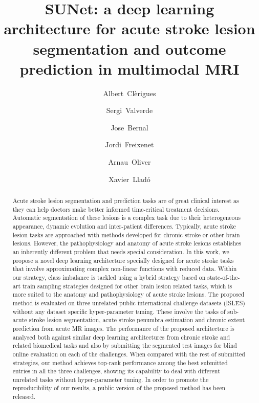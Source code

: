 \documentclass[letterpaper,final,authoryear,3p,times,twocolumn]{elsarticle}
\begin{document}
	
\begin{frontmatter}
	
	\title{SUNet: a deep learning architecture for acute stroke lesion segmentation and outcome prediction in multimodal MRI}
	
	\author{Albert~Cl\`erigues }
	\author{Sergi~Valverde \corref{}}
	\author{Jose~Bernal \corref{}}
	\author{Jordi~Freixenet \corref{}}
	\author{Arnau~Oliver \corref{}}
	\author{Xavier~Llad\'o \corref{}}
	
	\address{Institute of Computer Vision and Robotics, University of Girona, Spain}
	
	
	\begin{abstract}
		Acute stroke lesion segmentation and prediction tasks are of great clinical interest as they can help doctors make better informed time-critical treatment decisions. Automatic segmentation of these lesions is a complex task due to their heterogeneous appearance, dynamic evolution and inter-patient differences. Typically, acute stroke lesion tasks are approached with methods developed for chronic stroke or other brain lesions. However, the pathophysiology and anatomy of acute stroke lesions establishes an inherently different problem that needs special consideration. In this work, we propose a novel deep learning architecture specially designed for acute stroke tasks that involve approximating complex non-linear functions with reduced data. Within our strategy, class imbalance is tackled using a hybrid strategy based on state-of-the-art train sampling strategies designed for other brain lesion related tasks, which is more suited to the anatomy and pathophysiology of acute stroke lesions. The proposed method is evaluated on three unrelated public international challenge datasets (ISLES) without any dataset specific hyper-parameter tuning. These involve the tasks of sub-acute stroke lesion segmentation, acute stroke penumbra estimation and chronic extent prediction from acute MR images. The performance of the proposed architecture is analysed both against similar deep learning architectures from chronic stroke and related biomedical tasks and also by submitting the segmented test images for blind online evaluation on each of the challenges. When compared with the rest of submitted strategies, our method achieves top-rank performance among the best submitted entries in all the three challenges, showing its capability to deal with different unrelated tasks without hyper-parameter tuning. In order to promote the reproducibility of our results, a public version of the proposed method has been released.
	\end{abstract}
	

\end{frontmatter}
\end{document}
